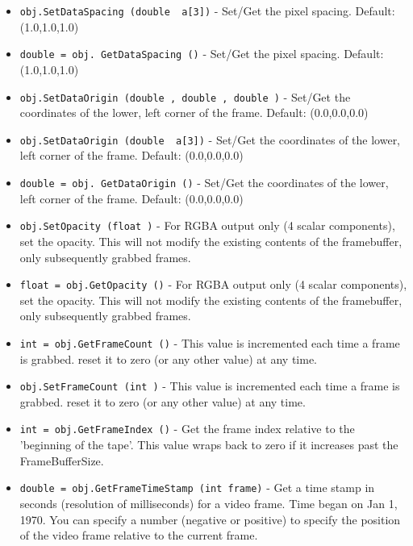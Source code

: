 \begin{itemize}
\item  \verb|obj.SetDataSpacing (double  a[3])| -  Set/Get the pixel spacing. 
 Default: (1.0,1.0,1.0)

\item  \verb|double = obj. GetDataSpacing ()| -  Set/Get the pixel spacing. 
 Default: (1.0,1.0,1.0)

\item  \verb|obj.SetDataOrigin (double , double , double )| -  Set/Get the coordinates of the lower, left corner of the frame. 
 Default: (0.0,0.0,0.0)

\item  \verb|obj.SetDataOrigin (double  a[3])| -  Set/Get the coordinates of the lower, left corner of the frame. 
 Default: (0.0,0.0,0.0)

\item  \verb|double = obj. GetDataOrigin ()| -  Set/Get the coordinates of the lower, left corner of the frame. 
 Default: (0.0,0.0,0.0)

\item  \verb|obj.SetOpacity (float )| -  For RGBA output only (4 scalar components), set the opacity.  This
 will not modify the existing contents of the framebuffer, only
 subsequently grabbed frames.

\item  \verb|float = obj.GetOpacity ()| -  For RGBA output only (4 scalar components), set the opacity.  This
 will not modify the existing contents of the framebuffer, only
 subsequently grabbed frames.

\item  \verb|int = obj.GetFrameCount ()| -  This value is incremented each time a frame is grabbed.
 reset it to zero (or any other value) at any time.

\item  \verb|obj.SetFrameCount (int )| -  This value is incremented each time a frame is grabbed.
 reset it to zero (or any other value) at any time.

\item  \verb|int = obj.GetFrameIndex ()| -  Get the frame index relative to the 'beginning of the tape'.  This
 value wraps back to zero if it increases past the FrameBufferSize.

\item  \verb|double = obj.GetFrameTimeStamp (int frame)| -  Get a time stamp in seconds (resolution of milliseconds) for
 a video frame.   Time began on Jan 1, 1970.  You can specify
 a number (negative or positive) to specify the position of the
 video frame relative to the current frame.


\end{itemize}

